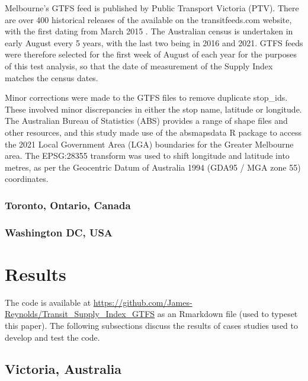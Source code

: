 \documentclass[numbered]{trbunofficial}
\begin{document}
Melbourne's GTFS feed is published by Public Transport Victoria (PTV).
There are over 400 historical releases of the available on the
transitfeeds.com website, with the first dating from March 2015
\citep{transitfeeds_victoria:2023aa}. The Australian census is
undertaken in early August every 5 years, with the last two being in
2016 and 2021. GTFS feeds were therefore selected for the first week of
August of each year for the purposes of this test analysis, so that the
date of measurement of the Supply Index matches the census dates.

Minor corrections were made to the GTFS files to remove duplicate
stop\_ids. These involved minor discrepancies in either the stop name,
latitude or longitude. The Australian Bureau of Statistics (ABS)
provides a range of shape files and other resources, and this study made
use of the absmapsdata R package \citep{R-absmapsdata} to access the
2021 Local Government Area (LGA) boundaries for the Greater Melbourne
area. The EPSG:28355 transform \citep{EPSG_28355} was used to shift
longitude and latitude into metres, as per the Geocentric Datum of
Australia 1994 (GDA95 / MGA zone 55) coordinates.

\hypertarget{toronto-ontario-canada}{%
\subsubsection{Toronto, Ontario, Canada}\label{toronto-ontario-canada}}

\hypertarget{washington-dc-usa}{%
\subsubsection{Washington DC, USA}\label{washington-dc-usa}}

\hypertarget{results}{%
\section{Results}\label{results}}

The code is available at
\url{https://github.com/James-Reynolds/Transit_Supply_Index_GTFS} as an
Rmarkdown file (used to typeset this paper). The following subsections
discuss the results of cases studies used to develop and test the code.

\hypertarget{victoria-australia}{%
\subsection{Victoria, Australia}\label{victoria-australia}}
\end{document}
